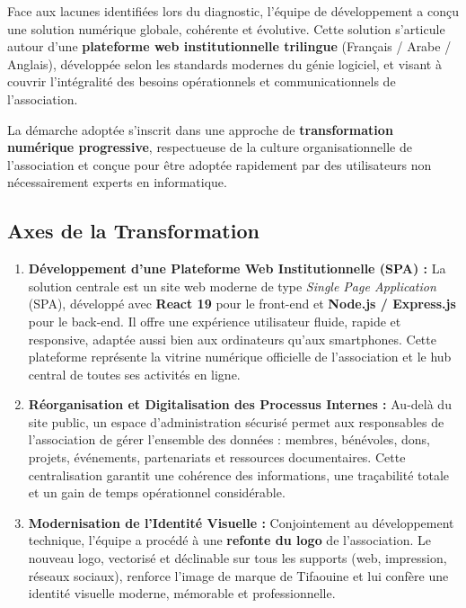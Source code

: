 \documentclass[12pt,a4paper,twoside,openright]{report}
\begin{document}
Face aux lacunes identifiées lors du diagnostic, l'équipe de développement a conçu une solution numérique globale, cohérente et évolutive. Cette solution s'articule autour d'une \textbf{plateforme web institutionnelle trilingue} (Français / Arabe / Anglais), développée selon les standards modernes du génie logiciel, et visant à couvrir l'intégralité des besoins opérationnels et communicationnels de l'association.

La démarche adoptée s'inscrit dans une approche de \textbf{transformation numérique progressive}, respectueuse de la culture organisationnelle de l'association et conçue pour être adoptée rapidement par des utilisateurs non nécessairement experts en informatique.

\vspace{0.5cm}

\subsection{Axes de la Transformation}

\begin{enumerate}[label=\textcolor{primaryBlue}{\textbf{\Alph*.}}, leftmargin=1.5cm, itemsep=0.5cm]

    \item \textbf{Développement d'une Plateforme Web Institutionnelle (SPA) :}
    La solution centrale est un site web moderne de type \textit{Single Page Application} (SPA), développé avec \textbf{React 19} pour le front-end et \textbf{Node.js / Express.js} pour le back-end. Il offre une expérience utilisateur fluide, rapide et responsive, adaptée aussi bien aux ordinateurs qu'aux smartphones. Cette plateforme représente la vitrine numérique officielle de l'association et le hub central de toutes ses activités en ligne.

    \item \textbf{Réorganisation et Digitalisation des Processus Internes :}
    Au-delà du site public, un espace d'administration sécurisé permet aux responsables de l'association de gérer l'ensemble des données : membres, bénévoles, dons, projets, événements, partenariats et ressources documentaires. Cette centralisation garantit une cohérence des informations, une traçabilité totale et un gain de temps opérationnel considérable.

    \item \textbf{Modernisation de l'Identité Visuelle :}
    Conjointement au développement technique, l'équipe a procédé à une \textbf{refonte du logo} de l'association. Le nouveau logo, vectorisé et déclinable sur tous les supports (web, impression, réseaux sociaux), renforce l'image de marque de Tifaouine et lui confère une identité visuelle moderne, mémorable et professionnelle.

\end{enumerate}
\end{document}
